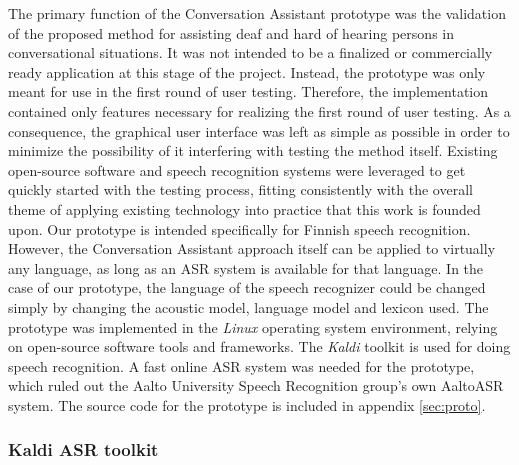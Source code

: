 \documentclass[english, 12pt, a4paper, pdftex, elec, utf8]{aaltothesis}
\begin{document}
The primary function of the Conversation Assistant prototype was the validation of the proposed method for assisting deaf and hard of hearing persons in conversational situations. It was not intended to be a finalized or commercially ready application at this stage of the project. Instead, the prototype was only meant for use in the first round of user testing. Therefore, the implementation contained only features necessary for realizing the first round of user testing. As a consequence, the graphical user interface was left as simple as possible in order to minimize the possibility of it interfering with testing the method itself. Existing open-source software and speech recognition systems were leveraged to get quickly started with the testing process, fitting consistently with the overall theme of applying existing technology into practice that this work is founded upon. Our prototype is intended specifically for Finnish speech recognition. However, the Conversation Assistant approach itself can be applied to virtually any language, as long as an ASR system is available for that language. In the case of our prototype, the language of the speech recognizer could be changed simply by changing the acoustic model, language model and lexicon used. The prototype was implemented in the \textit{Linux} operating system environment, relying on open-source software tools and frameworks. The \textit{Kaldi} toolkit is used for doing speech recognition. A fast online ASR system was needed for the prototype, which ruled out the Aalto University Speech Recognition group's own AaltoASR system. The source code for the prototype is included in appendix \ref{sec:proto}. 

\subsubsection{Kaldi ASR toolkit} \label{sec:kaldi}
\end{document}
